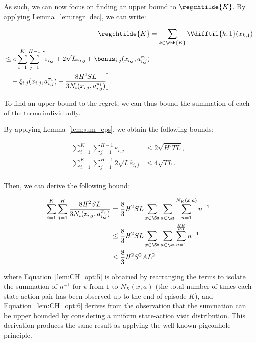 As such, we can now focus on finding an upper bound to $\regchtilde{K}$. By applying Lemma~\ref{lem:regr_dec}, we can write:

\begin{align}
    \regchtilde{K} &= \sum_{k \in \dsb{K}} \Vdifftil{k,1}(x_{k,1}) \nonumber \\
    \begin{split}
    \label{lem:CH_opt:3}
    &\le e \sum_{i=1}^K\sum_{j=1}^{H-1} \bigg[ \varepsilon_{i,j} + 2 \sqrt{L} \overline{\varepsilon}_{i,j} + \bonus_{i,j}(x_{i,j}, a_{i,j}^{\pi_i}) \\
    &\quad + \xi_{i,j} (x_{i,j}, a_{i,j}^{\pi_i}) + \frac{8H^2SL}{3 N_i (x_{i,j}, a_{i,j}^{\pi_i})} \bigg].
    \end{split}
\end{align}

To find an upper bound to the regret, we can thus bound the summation of each of the terms individually.

By applying Lemma~\ref{lem:sum_eps}, we obtain the following bounds:

\begin{align*}
    \sum_{i=1}^K \sum_{j=1}^{H-1} \varepsilon_{i,j} &\le 2 \sqrt{H^2 T L}, \\
    \sum_{i=1}^K \sum_{j=1}^{H-1} 2 \sqrt{L} \overline{\varepsilon}_{i,j} &\le 4 \sqrt{T L}. \\
\end{align*}

Then, we can derive the following bound:

\begin{align}
    \sum_{i=1}^K \sum_{j=1}^H \frac{8H^2SL}{3N_i(x_{i,j},a_{i,j}^{\pi_i})} &= \frac{8}{3}H^2SL \sum_{x \in \Ss} \sum_{a \in \As} \sum_{n=1}^{N_K(x,a)} n^{-1} \label{lem:CH_opt:5} \\
    &\le \frac{8}{3}H^2SL \sum_{x \in \Ss} \sum_{a \in \As} \sum_{n=1}^{\frac{KH}{SA}} n^{-1} \label{lem:CH_opt:6} \\
    &\le \frac{8}{3} H^2 S^2 A L^2 \nonumber
\end{align}

where Equation~\eqref{lem:CH_opt:5} is obtained by rearranging the terms to isolate the summation of $n^{-1}$ for $n$ from $1$ to $N_K(x,a)$ (\ie the total number of times each state-action pair has been observed up to the end of episode $K$), and Equation~\eqref{lem:CH_opt:6} derives from the observation that the summation can be upper bounded by considering a uniform state-action visit distribution. This derivation produces the same result as applying the well-known pigeonhole principle.


